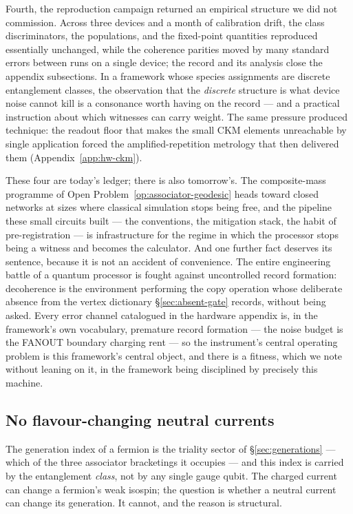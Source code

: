 Fourth, the reproduction campaign returned an empirical structure we did not commission. Across
three devices and a month of calibration drift, the class discriminators, the populations, and
the fixed-point quantities reproduced essentially unchanged, while the coherence parities moved
by many standard errors between runs on a single device; the record and its analysis close the
appendix subsections. In a framework whose species assignments are discrete entanglement classes,
the observation that the \emph{discrete} structure is what device noise cannot kill is a
consonance worth having on the record --- and a practical instruction about which witnesses can
carry weight. The same pressure produced technique: the readout floor that makes the small CKM
elements unreachable by single application forced the amplified-repetition metrology that then
delivered them (Appendix~\ref{app:hw-ckm}).

These four are today's ledger; there is also tomorrow's. The composite-mass programme of Open
Problem~\ref{op:associator-geodesic} heads toward closed networks at sizes where classical
simulation stops being free, and the pipeline these small circuits built --- the conventions, the
mitigation stack, the habit of pre-registration --- is infrastructure for the regime in which the
processor stops being a witness and becomes the calculator. And one further fact deserves its
sentence, because it is not an accident of convenience. The entire engineering battle of a
quantum processor is fought against uncontrolled record formation: decoherence is the environment
performing the copy operation whose deliberate absence from the vertex dictionary
\S\ref{sec:absent-gate} records, without being asked. Every error channel catalogued in the
hardware appendix is, in the framework's own vocabulary, premature record formation --- the noise
budget is the FANOUT boundary charging rent --- so the instrument's central operating problem is
this framework's central object, and there is a fitness, which we note without leaning on it, in
the framework being disciplined by precisely this machine.

\subsection{No flavour-changing neutral currents}

The generation index of a fermion is the triality sector of \S\ref{sec:generations} --- which of the
three associator bracketings it occupies --- and this index is carried by the entanglement
\emph{class}, not by any single gauge qubit. The charged current can change a fermion's weak isospin;
the question is whether a neutral current can change its generation. It cannot, and the reason is
structural.

